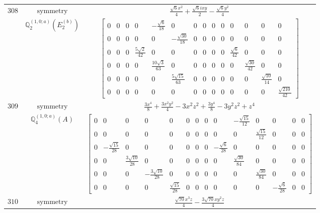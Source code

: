 \documentclass[fleqn,8pt,landscape]{jsarticle}
\begin{document}
\begin{longtable}{ccc}
$ 308 $ & $ \text{symmetry} $ & $ \frac{\sqrt{6} x^{2}}{4} + \frac{\sqrt{6} i x y}{2} - \frac{\sqrt{6} y^{2}}{4} $ \\
$  $ & $ \mathbb{Q}_{2}^{(1,0;a)}(E_{2}^{(b)}) $ & $ \begin{bmatrix} 0 & 0 & 0 & 0 & - \frac{\sqrt{6}}{18} & 0 & 0 & 0 & 0 & 0 & 0 & 0 & 0 & 0 \\ 0 & 0 & 0 & 0 & 0 & - \frac{\sqrt{30}}{18} & 0 & 0 & 0 & 0 & 0 & 0 & 0 & 0 \\ 0 & 0 & 0 & \frac{5 \sqrt{2}}{42} & 0 & 0 & 0 & 0 & 0 & 0 & \frac{\sqrt{6}}{42} & 0 & 0 & 0 \\ 0 & 0 & 0 & 0 & \frac{10 \sqrt{3}}{63} & 0 & 0 & 0 & 0 & 0 & 0 & \frac{\sqrt{30}}{42} & 0 & 0 \\ 0 & 0 & 0 & 0 & 0 & \frac{5 \sqrt{15}}{63} & 0 & 0 & 0 & 0 & 0 & 0 & \frac{\sqrt{10}}{14} & 0 \\ 0 & 0 & 0 & 0 & 0 & 0 & 0 & 0 & 0 & 0 & 0 & 0 & 0 & \frac{\sqrt{210}}{42} \end{bmatrix} $ \\ \hline
$ 309 $ & $ \text{symmetry} $ & $ \frac{3 x^{4}}{8} + \frac{3 x^{2} y^{2}}{4} - 3 x^{2} z^{2} + \frac{3 y^{4}}{8} - 3 y^{2} z^{2} + z^{4} $ \\
$  $ & $ \mathbb{Q}_{4}^{(1,0;a)}(A) $ & $ \begin{bmatrix} 0 & 0 & 0 & 0 & 0 & 0 & 0 & 0 & 0 & - \frac{\sqrt{15}}{12} & 0 & 0 & 0 & 0 \\ 0 & 0 & 0 & 0 & 0 & 0 & 0 & 0 & 0 & 0 & \frac{\sqrt{15}}{12} & 0 & 0 & 0 \\ 0 & - \frac{\sqrt{15}}{28} & 0 & 0 & 0 & 0 & 0 & 0 & - \frac{\sqrt{6}}{28} & 0 & 0 & 0 & 0 & 0 \\ 0 & 0 & \frac{3 \sqrt{10}}{28} & 0 & 0 & 0 & 0 & 0 & 0 & \frac{\sqrt{30}}{84} & 0 & 0 & 0 & 0 \\ 0 & 0 & 0 & - \frac{3 \sqrt{10}}{28} & 0 & 0 & 0 & 0 & 0 & 0 & \frac{\sqrt{30}}{84} & 0 & 0 & 0 \\ 0 & 0 & 0 & 0 & \frac{\sqrt{15}}{28} & 0 & 0 & 0 & 0 & 0 & 0 & - \frac{\sqrt{6}}{28} & 0 & 0 \end{bmatrix} $ \\ \hline
$ 310 $ & $ \text{symmetry} $ & $ \frac{\sqrt{70} x^{3} z}{4} - \frac{3 \sqrt{70} x y^{2} z}{4} $ \\

\end{longtable}
\end{document}
